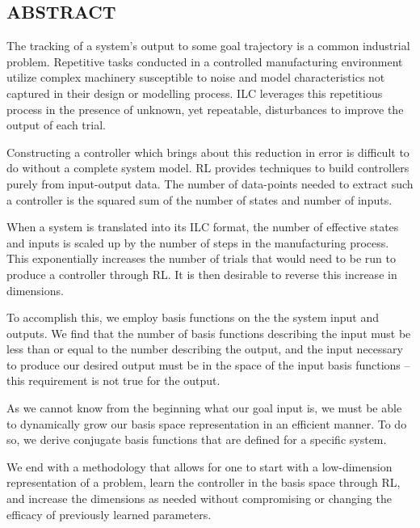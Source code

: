 \pagestyle{plain}
\begin{center}


\section*{ABSTRACT}


\end{center}
The tracking of a system's output to some goal trajectory is a common industrial problem. Repetitive tasks conducted in a controlled manufacturing environment utilize complex machinery susceptible to noise and model characteristics not captured in their design or modelling process. \ac{ILC} leverages this repetitious process in the presence of unknown, yet repeatable, disturbances to improve the output of each trial.

Constructing a controller which brings about this reduction in error is difficult to do without a complete system model. \ac{RL} provides techniques to build controllers purely from input-output data. The number of data-points needed to extract such a controller is the squared sum of the number of states and number of inputs.

When a system is translated into its ILC format, the number of effective states and inputs is scaled up by the number of steps in the manufacturing process. This exponentially increases the number of trials that would need to be run to produce a controller through RL. It is then desirable to reverse this increase in dimensions.

To accomplish this, we employ basis functions on the the system input and outputs. We find that the number of basis functions describing the input must be less than or equal to the number describing the output, and the input necessary to produce our desired output must be in the space of the input basis functions -- this requirement is not true for the output.

As we cannot know from the beginning what our goal input is, we must be able to dynamically grow our basis space representation in an efficient manner. To do so, we derive conjugate basis functions that are defined for a specific system.

We end with a methodology that allows for one to start with a low-dimension representation of a problem, learn the controller in the basis space through RL, and increase the dimensions as needed without compromising or changing the efficacy of previously learned parameters.

\cleardoublepage%